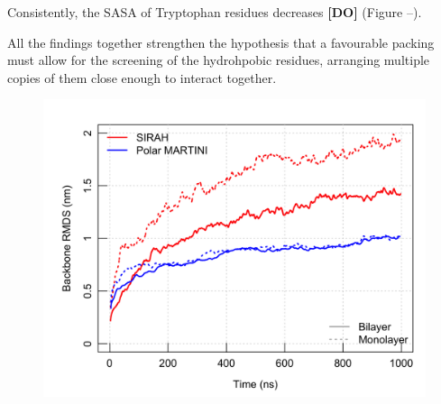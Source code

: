 Consistently, the SASA of Tryptophan residues decreases \textbf{[DO]} (Figure --).

All the findings together strengthen the hypothesis that a favourable packing must allow for the screening of the hydrohpobic residues, arranging multiple copies of them close enough to interact together.

\begin{figure}
    \begin{minipage}[c]{0.5\textwidth}
        \includegraphics[width=\linewidth]{3results_capsule/pics/compare_MonoBi_rmsd.png} \\

\end{minipage}
\end{figure}
